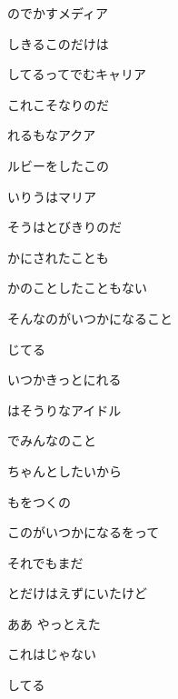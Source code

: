 のでかすメディア

しきるこのだけは

してるってでむキャリア

これこそなりのだ

れるもなアクア

ルビーをしたこの

いりうはマリア

そうはとびきりのだ

\bigskip

かにされたことも

かのことしたこともない

そんなのがいつかになること

じてる

\bigskip

いつかきっとにれる

はそうりなアイドル

でみんなのこと

ちゃんとしたいから

もをつくの

このがいつかになるをって

それでもまだ

とだけはえずにいたけど

ああ やっとえた

これはじゃない

してる
